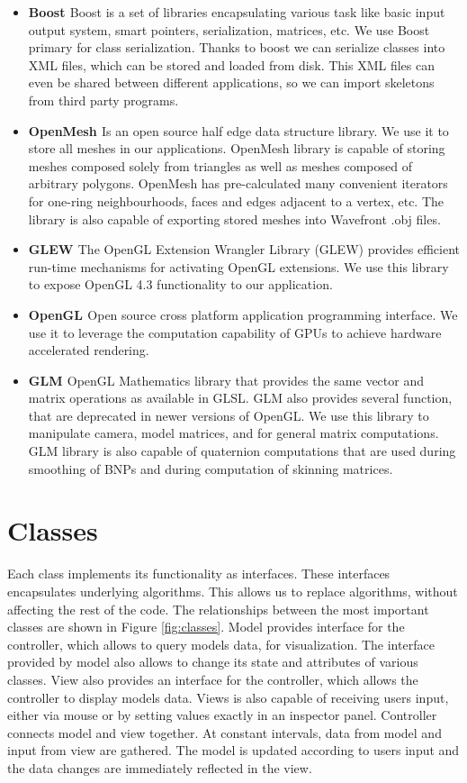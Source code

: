\begin{itemize}
	\item \textbf{Boost \cite{Boost}} Boost is a set of libraries encapsulating various task like basic input output system, smart pointers, serialization, matrices, etc. We use Boost primary for class serialization. Thanks to boost we can serialize classes into XML files, which can be stored and loaded from disk. This XML files can even be shared between different applications, so we can import skeletons from third party programs.
	\item \textbf{OpenMesh \cite{OpenMesh}} Is an open source half edge data structure library. We use it to store all meshes in our applications. OpenMesh library is capable of storing meshes composed solely from triangles as well as meshes composed of arbitrary polygons. OpenMesh has pre-calculated many convenient iterators for one-ring neighbourhoods, faces and edges adjacent to a vertex, etc. The library is also capable of exporting stored meshes into Wavefront .obj files.
	\item \textbf{GLEW \cite{glew}} The OpenGL Extension Wrangler Library (GLEW) provides efficient run-time mechanisms for activating OpenGL extensions. We use this library to expose OpenGL 4.3 functionality to our application.
	\item \textbf{OpenGL \cite{opengl}} Open source cross platform application programming interface. We use it to leverage the computation capability of GPUs to achieve hardware accelerated rendering.
	\item \textbf{GLM \cite{glm}} OpenGL Mathematics library that provides the same vector and matrix operations as available in GLSL. GLM also provides several function, that are deprecated in newer versions of OpenGL. We use this library to manipulate camera, model matrices, and for general matrix computations. GLM library is also capable of quaternion computations that are used during smoothing of BNPs and during computation of skinning matrices.
\end{itemize}

\pagebreak

\section{Classes}

Each class implements its functionality as interfaces.
These interfaces encapsulates underlying algorithms.
This allows us to replace algorithms, without affecting the rest of the code.
The relationships between the most important classes are shown in Figure \ref{fig:classes}.
Model provides interface for the controller, which allows to query models data, for visualization.
The interface provided by model also allows to change its state and attributes of various classes.
View also provides an interface for the controller, which allows the controller to display models data.
Views is also capable of receiving users input, either via mouse or by setting values exactly in an inspector panel.
Controller connects model and view together.
At constant intervals, data from model and input from view are gathered.
The model is updated according to users input and the data changes are immediately reflected in the view.

